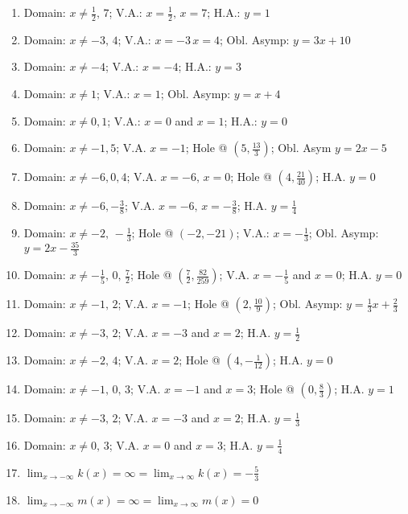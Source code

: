 \begin{enumerate}
    \item Domain: $x \neq \frac{1}{2}, \, 7$; V.A.: $x=\frac{1}{2}, \, x=7$; H.A.: $y=1$
    \item Domain: $x \neq -3, \, 4$; V.A.: $x=-3 \, x = 4$; Obl. Asymp: $y = 3x+10$
    \item Domain: $x \neq -4$; V.A.: $x = -4$; H.A.: $y = 3$
    \item Domain: $x \neq 1$; V.A.: $x = 1$; Obl. Asymp: $y = x + 4$
    \item Domain: $x \neq 0, 1$; V.A.: $x = 0$ and $x = 1$; H.A.: $y = 0$ 
    \item Domain: $x \neq -1, 5$; V.A. $x=-1$; Hole @ $\left(5, \frac{13}{3}\right)$; Obl. Asym $y = 2x-5$
    \item Domain: $x \neq -6, 0, 4$; V.A. $x = -6, \, x = 0$; Hole @ $\left(4, \frac{21}{40}\right)$; H.A. $y = 0$
    \item Domain: $x \neq -6, -\frac{3}{8}$; V.A. $x = -6, \, x = -\frac{3}{8}$; H.A. $y = \frac{1}{4}$
    \item Domain: $x \neq -2, \, -\frac{1}{3}$; Hole @ $(-2,-21)$; V.A.: $x = -\frac{1}{3}$; Obl. Asymp: $y = 2x-\frac{35}{3}$
    \item Domain: $x \neq -\frac{1}{5}, \, 0, \, \frac{7}{2}$; Hole @ $\left(\frac{7}{2}, \frac{82}{259}\right)$; V.A. $x = -\frac{1}{5}$ and $x=0$; H.A. $y=0$
    \item Domain: $x \neq -1, \, 2$; V.A. $x = -1$; Hole @ $\left(2, \frac{10}{9}\right)$; Obl. Asymp: $y = \frac{1}{3}x+\frac{2}{3}$
    \item Domain: $x \neq -3, \, 2$; V.A. $x = -3$ and $x = 2$; H.A. $y = \frac{1}{2}$
    \item Domain: $x \neq -2, \, 4$; V.A. $x = 2$; Hole @ $\left(4, -\frac{1}{12}\right)$; H.A. $y = 0$
    \item Domain: $x \neq -1, \, 0, \, 3$; V.A. $x = -1$ and $x = 3$; Hole @ $\left(0, \frac{8}{3}\right)$; H.A. $y = 1$
    \item Domain: $x \neq -3, \, 2$; V.A. $x = -3$ and $x = 2$; H.A. $y = \frac{1}{3}$
    \item Domain: $x \neq 0, \, 3$; V.A. $x = 0$ and $x = 3$; H.A. $y = \frac{1}{4}$
    
    \item $\displaystyle \lim_{x \to -\infty} k(x) = \infty = \lim_{x \to \infty} k(x) = -\frac{5}{3}$
    \item $\displaystyle \lim_{x \to -\infty} m(x) = \infty = \lim_{x \to \infty} m(x) = 0$
\end{enumerate}
